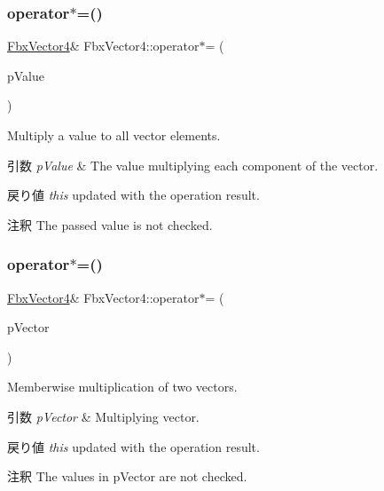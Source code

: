 \subsubsection{\texorpdfstring{operator$\ast$=()}{operator*=()}\hspace{0.1cm}{\footnotesize\ttfamily [1/2]}}
{\footnotesize\ttfamily \hyperlink{class_fbx_vector4}{Fbx\+Vector4}\& Fbx\+Vector4\+::operator$\ast$= (\begin{DoxyParamCaption}\item[{double}]{p\+Value }\end{DoxyParamCaption})}

Multiply a value to all vector elements. 
\begin{DoxyParams}{引数}
{\em p\+Value} & The value multiplying each component of the vector. \\
\hline
\end{DoxyParams}
\begin{DoxyReturn}{戻り値}
{\itshape this} updated with the operation result. 
\end{DoxyReturn}
\begin{DoxyRemark}{注釈}
The passed value is not checked. 
\end{DoxyRemark}
\mbox{\label{class_fbx_vector4_a77aeb266383501325fb91538ca17ff4c}} 
\subsubsection{\texorpdfstring{operator$\ast$=()}{operator*=()}\hspace{0.1cm}{\footnotesize\ttfamily [2/2]}}
{\footnotesize\ttfamily \hyperlink{class_fbx_vector4}{Fbx\+Vector4}\& Fbx\+Vector4\+::operator$\ast$= (\begin{DoxyParamCaption}\item[{const \hyperlink{class_fbx_vector4}{Fbx\+Vector4} \&}]{p\+Vector }\end{DoxyParamCaption})}

Memberwise multiplication of two vectors. 
\begin{DoxyParams}{引数}
{\em p\+Vector} & Multiplying vector. \\
\hline
\end{DoxyParams}
\begin{DoxyReturn}{戻り値}
{\itshape this} updated with the operation result. 
\end{DoxyReturn}
\begin{DoxyRemark}{注釈}
The values in p\+Vector are not checked. 
\end{DoxyRemark}
\mbox{\label{class_fbx_vector4_a4a3e913f9e722a63bc23cc0fe324965e}} 
